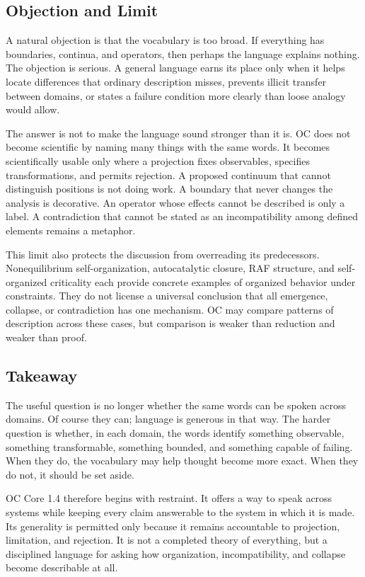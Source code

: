 \documentclass[11pt,a4paper,openany]{book}
\begin{document}
\subsection{Objection and Limit}
A natural objection is that the vocabulary is too broad. If everything has boundaries, continua, and operators, then perhaps the language explains nothing. The objection is serious. A general language earns its place only when it helps locate differences that ordinary description misses, prevents illicit transfer between domains, or states a failure condition more clearly than loose analogy would allow. \cite{nicolis_prigogine_selforg,kauffman_autocatalytic}\par
The answer is not to make the language sound stronger than it is. OC does not become scientific by naming many things with the same words. It becomes scientifically usable only where a projection fixes observables, specifies transformations, and permits rejection. A proposed continuum that cannot distinguish positions is not doing work. A boundary that never changes the analysis is decorative. An operator whose effects cannot be described is only a label. A contradiction that cannot be stated as an incompatibility among defined elements remains a metaphor.\par
This limit also protects the discussion from overreading its predecessors. Nonequilibrium self-organization, autocatalytic closure, RAF structure, and self-organized criticality each provide concrete examples of organized behavior under constraints. They do not license a universal conclusion that all emergence, collapse, or contradiction has one mechanism. OC may compare patterns of description across these cases, but comparison is weaker than reduction and weaker than proof.\par
\subsection{Takeaway}
The useful question is no longer whether the same words can be spoken across domains. Of course they can; language is generous in that way. The harder question is whether, in each domain, the words identify something observable, something transformable, something bounded, and something capable of failing. When they do, the vocabulary may help thought become more exact. When they do not, it should be set aside. \cite{nicolis_prigogine_selforg,kauffman_autocatalytic}\par
OC Core 1.4 therefore begins with restraint. It offers a way to speak across systems while keeping every claim answerable to the system in which it is made. Its generality is permitted only because it remains accountable to projection, limitation, and rejection. It is not a completed theory of everything, but a disciplined language for asking how organization, incompatibility, and collapse become describable at all.\par
\end{document}
